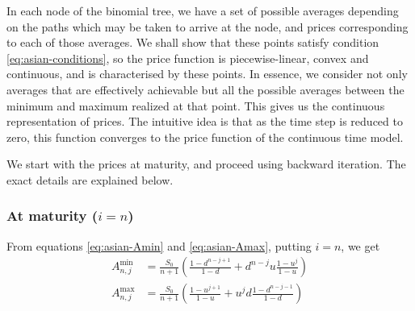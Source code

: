 In each node of the binomial tree, we have a set of possible averages depending on the paths which may be taken to arrive at the node, and prices corresponding to each of those averages. We shall show that these points satisfy condition \ref{eq:asian-conditions}, so the price function is piecewise-linear, convex and continuous, and is characterised by these points. In essence, we consider not only averages that are effectively achievable but all the possible averages between the minimum and maximum realized at that point. This gives us the continuous representation of prices. The intuitive idea is that as the time step is reduced to zero, this function converges to the price function of the continuous time model.

We start with the prices at maturity, and proceed using backward iteration. The exact details are explained below.


\subsubsection*{At maturity ($ i = n $)}

From equations \ref{eq:asian-Amin} and \ref{eq:asian-Amax}, putting $i = n$, we get
\begin{align*}
	A_{n,j}^{\min} &= \frac{S_0}{n+1} \left( \frac{1 - d^{n-j+1}}{1-d} + d^{n-j} u \frac{1 - u^{j}}{1-u} \right) \\
	A_{n,j}^{\max} &= \frac{S_0}{n+1} \left( \frac{1 - u^{j+1}}{1-u} + u^{j} d \frac{1 - d^{n-j-1}}{1-d} \right)
\end{align*}

